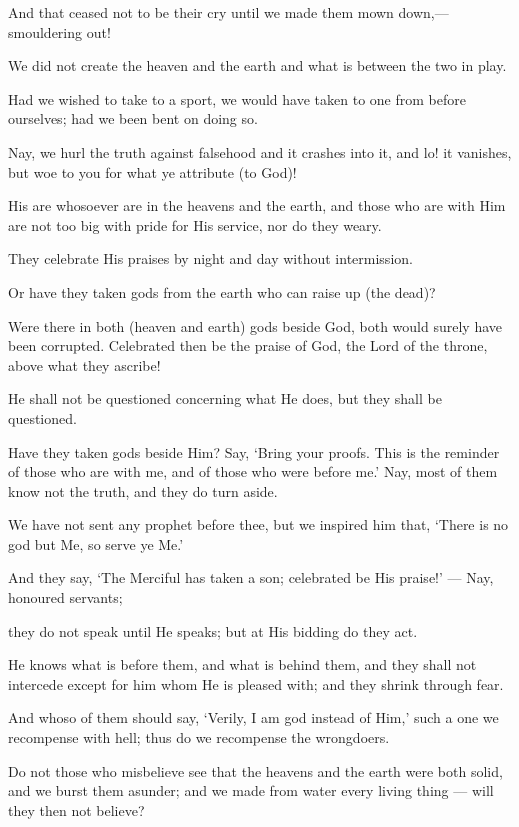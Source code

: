 \documentclass[fontsize=14pt, letterpaper, notitlepage, openany, DIV=12]{scrbook} %
\begin{document}
\noindent[21:15]
And that ceased not to be their cry until we made them mown down,--- smouldering out!

\noindent[21:16]
We did not create the heaven and the earth and what is between the two in play.

\noindent[21:17]
Had we wished to take to a sport, we would have taken to one from before ourselves; had
we been bent on doing so.

\noindent[21:18]
Nay, we hurl the truth against falsehood and it crashes into it, and lo! it vanishes, but woe
to you for what ye attribute (to God)!

\noindent[21:19]
His are whosoever are in the heavens and the earth, and those who are with Him are not
too big with pride for His service, nor do they weary.

\noindent[21:20]
They celebrate His praises by night and day without intermission.

\noindent[21:21]
Or have they taken gods from the earth who can raise up (the dead)?

\noindent[21:22]
Were there in both (heaven and earth) gods beside God, both would surely have been
corrupted. Celebrated then be the praise of God, the Lord of the throne, above what they ascribe!

\noindent[21:23]
He shall not be questioned concerning what He does, but they shall be questioned.

\noindent[21:24]
Have they taken gods beside Him? Say, `Bring your proofs. This is the reminder of those
who are with me, and of those who were before me.' Nay, most of them know not the truth, and
they do turn aside.

\noindent[21:25]
We have not sent any prophet before thee, but we inspired him that, `There is no god but
Me, so serve ye Me.'

\noindent[21:26]
And they say, `The Merciful has taken a son; celebrated be His praise!' --- Nay, honoured
servants;

\noindent[21:27]
they do not speak until He speaks; but at His bidding do they act.

\noindent[21:28]
He knows what is before them, and what is behind them, and they shall not intercede
except for him whom He is pleased with; and they shrink through fear.

\noindent[21:29]
And whoso of them should say, `Verily, I am god instead of Him,' such a one we
recompense with hell; thus do we recompense the wrongdoers.

\noindent[21:30]
Do not those who misbelieve see that the heavens and the earth were both solid, and we
burst them asunder; and we made from water every living thing --- will they then not believe?
\end{document}

